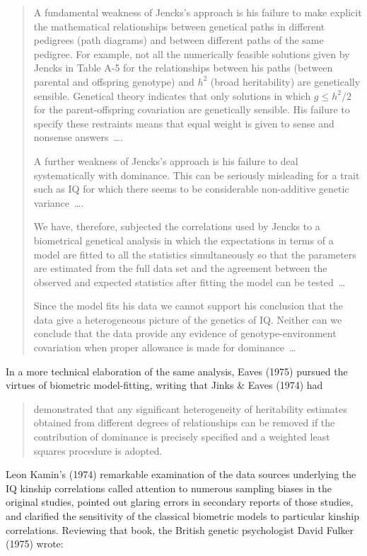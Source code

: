 ﻿\documentclass[12pt]{article}
\begin{document}
\begin{quote}
A fundamental weakness of Jencks's approach is his failure to make explicit the mathematical relationships between genetical paths in different pedigrees (path diagrams) and between different paths of the same pedigree. For example, not all the numerically feasible solutions given by Jencks in Table A-5 for the relationships between his paths (between parental and offspring genotype) and $h^2$ (broad heritability) are genetically sensible. Genetical theory indicates that only solutions in which $g \le h^2/2$ for the parent-offspring covariation are genetically sensible. His failure to specify these restraints means that equal weight is given to sense and nonsense answers~\ldots.

A further weakness of Jencks's approach is his failure to deal systematically with dominance. This can be seriously misleading for a trait such as IQ for which there seems to be considerable non-additive genetic variance~\ldots.

We have, therefore, subjected the correlations used by Jencks to a biometrical genetical analysis in which the expectations in terms of a model are fitted to all the statistics simultaneously so that the parameters are estimated from the full data set and the agreement between the observed and expected statistics after fitting the model can be tested~\ldots

Since the model fits his data we cannot support his conclusion that the data give a heterogeneous picture of the genetics of IQ. Neither can we conclude that the data provide any evidence of genotype-environment covariation when proper allowance is made for dominance~\ldots
\end{quote}

In a more technical elaboration of the same analysis, Eaves (1975) pursued the virtues of biometric model-fitting, writing that Jinks \& Eaves (1974) had

\begin{quote}
demonstrated that any significant heterogeneity of heritability estimates obtained from different degrees of relationships can be removed if the contribution of dominance is precisely specified and a weighted least squares procedure is adopted.
\end{quote}

Leon Kamin's (1974) remarkable examination of the data sources underlying the IQ kinship correlations called attention to numerous sampling biases in the original studies, pointed out glaring errors in secondary reports of those studies, and clarified the sensitivity of the classical biometric models to particular kinship correlations. Reviewing that book, the British genetic psychologist David Fulker (1975) wrote:
\end{document}
